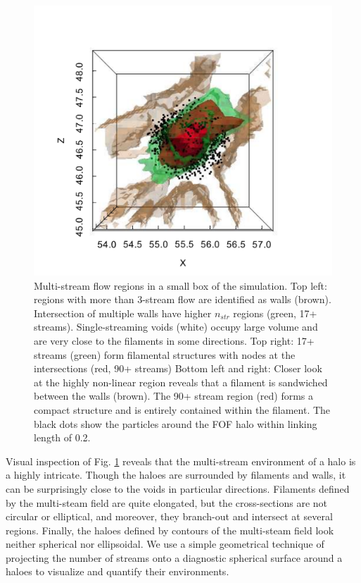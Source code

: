 \begin{figure}
\begin{minipage}[c]{0.45\linewidth}
\end{minipage}
\begin{minipage}[c]{0.45\linewidth}
\includegraphics[width=9.cm]{Chapter3/Source_v2/fig5d} 
\end{minipage} 

\caption{Multi-stream flow regions in a small box of the simulation. Top left: regions with more than 3-stream flow are identified as walls (brown). Intersection of multiple walls have higher $n_{str}$ regions (green, 17+ streams). Single-streaming voids (white) occupy large volume and are very close to the filaments in some directions. Top right: 17+ streams (green) form filamental structures with nodes at the intersections (red, 90+ streams)
Bottom left and right:  Closer look at the highly non-linear region reveals that a filament is sandwiched between the walls (brown). The 90+ stream region (red) forms a compact structure and is entirely contained within the filament. The black dots show the particles around the FOF halo within linking length of 0.2.}
\label{fig:4view}
\end{figure}

Visual inspection of Fig. \ref{fig:4view} reveals that the multi-stream environment of a halo is a highly intricate. Though the haloes are surrounded by filaments and walls, it can be surprisingly close to the voids in particular directions. Filaments 
defined by the multi-steam field are  quite elongated, but the cross-sections are not circular or elliptical, and moreover, they branch-out and intersect at several regions. Finally, the  haloes defined by contours of the multi-steam field look neither spherical nor ellipsoidal. 
We use a simple geometrical technique of projecting the number of streams onto a diagnostic spherical surface around 
a haloes to visualize and quantify their environments.  


